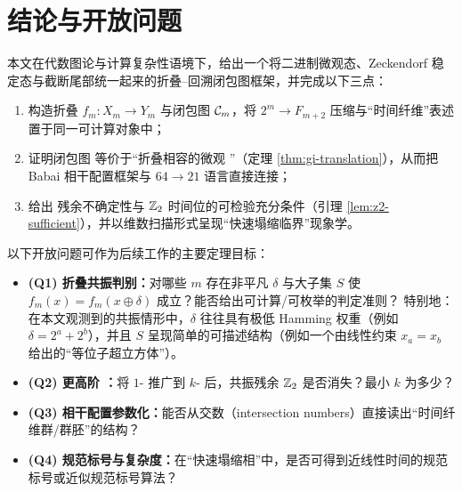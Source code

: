 
\section{结论与开放问题}

本文在代数图论与计算复杂性语境下，给出一个将二进制微观态、Zeckendorf 稳定态与截断尾部统一起来的折叠--回溯闭包图框架，并完成以下三点：
\begin{enumerate}
  \item 构造折叠 $f_m:X_m\to Y_m$ 与闭包图 $\mathcal{C}_m$，将 $2^m\to F_{m+2}$ 压缩与“时间纤维”表述置于同一可计算对象中；
  \item 证明闭包图 \GI{} 等价于“折叠相容的微观 \GI{}”（定理 \ref{thm:gi-translation}），从而把 Babai 相干配置框架与 $64\to 21$ 语言直接连接；
  \item 给出 \WL{} 残余不确定性与 $\mathbb{Z}_2$ 时间位的可检验充分条件（引理 \ref{lem:z2-sufficient}），并以维数扫描形式呈现“快速塌缩临界”现象学。
\end{enumerate}

以下开放问题可作为后续工作的主要定理目标：
\begin{itemize}
  \item \textbf{(Q1) 折叠共振判别：}对哪些 $m$ 存在非平凡 $\delta$ 与大子集 $S$ 使 $f_m(x)=f_m(x\oplus\delta)$ 成立？能否给出可计算/可枚举的判定准则？
  特别地：在本文观测到的共振情形中，$\delta$ 往往具有极低 Hamming 权重（例如 $\delta=2^a+2^b$），并且 $S$ 呈现简单的可描述结构（例如一个由线性约束 $x_a=x_b$ 给出的“等位子超立方体”）。
  \item \textbf{(Q2) 更高阶 \WL{}：}将 $1$-\WL{} 推广到 $k$-\WL{} 后，共振残余 $\mathbb{Z}_2$ 是否消失？最小 $k$ 为多少？
  \item \textbf{(Q3) 相干配置参数化：}能否从交数（intersection numbers）直接读出“时间纤维群/群胚”的结构？
  \item \textbf{(Q4) 规范标号与复杂度：}在“快速塌缩相”中，是否可得到近线性时间的规范标号或近似规范标号算法？
\end{itemize}

